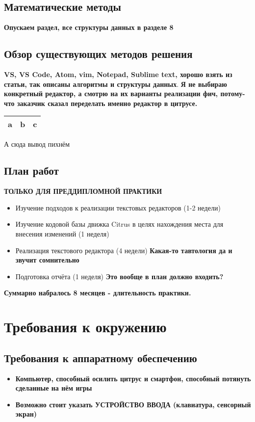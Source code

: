\documentclass{fefu}
\begin{document}
		\subsection{Математические методы}
			\textbf{Опускаем раздел, все структуры данных в разделе 8}	
		\subsection{Обзор существующих методов решения}
			\par \textbf{VS, VS Code, Atom, vim, Notepad, Sublime text, хорошо взять из статьи,
			так описаны алгоритмы и структуры данных}.
			\textbf{Я не выбираю конкретный редактор, а смотрю на их варианты реализации фич, 
			потому-что заказчик сказал переделать именно редактор в цитрусе.}
			\begin{center}
				\begin{tabular}{ |l|c|r|}
					\hline
					a & b & c \\
					\hline
				\end{tabular}
			\end{center}
			\par А сюда вывод пихнём
		\subsection{План работ}
			\par \textbf{ТОЛЬКО ДЛЯ ПРЕДДИПЛОМНОЙ ПРАКТИКИ}
			\begin{itemize}
				\item Изучение подходов к реализации текстовых редакторов (1-2 недели)
				\item Изучение кодовой базы движка Citrus в целях нахождения места для внесения
				изменений (1 неделя)
				\item Реализация текстового редактора (4 недели) \textbf{Какая-то тавтология 
				да и звучит сомнительно}
				\item Подготовка отчёта (1 неделя) \textbf{Это вообще в план должно входить?}
			\end{itemize}
			\textbf{Суммарно набралось 8 месяцев - длительность практики.}
	\section{Требования к окружению}
		\subsection{Требования к аппаратному обеспечению}
			\begin{itemize}
				\item \textbf{Компьютер, способный осилить цитрус и смартфон, способный 
				потянуть сделанные на нём игры}
				\item \textbf{Возможно стоит указать УСТРОЙСТВО ВВОДА (клавиатура, сенсорный
				экран)}
			\end{itemize}
\end{document}
